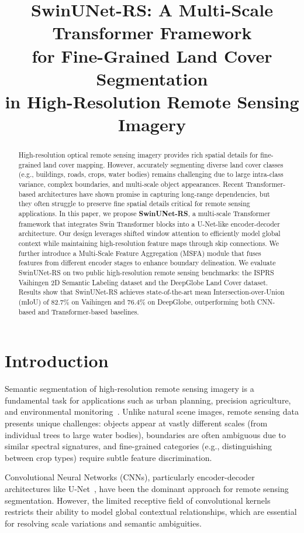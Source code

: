 \documentclass[conference]{IEEEtran}
\title{SwinUNet-RS: A Multi-Scale Transformer Framework\\for Fine-Grained Land Cover Segmentation\\in High-Resolution Remote Sensing Imagery}
\author{
\IEEEauthorblockN{Your Name\IEEEauthorrefmark{1}, Collaborator Name\IEEEauthorrefmark{2}}
\IEEEauthorblockA{\IEEEauthorrefmark{1}Department of Remote Sensing, University of Example, Country}
\IEEEauthorblockA{\IEEEauthorrefmark{2}Institute of Geospatial Informatics, Research Lab, Country}
}
\begin{document}
\maketitle

\begin{abstract}
High-resolution optical remote sensing imagery provides rich spatial details for fine-grained land cover mapping.
However, accurately segmenting diverse land cover classes (e.g., buildings, roads, crops, water bodies) remains challenging
due to large intra-class variance, complex boundaries, and multi-scale object appearances.
Recent Transformer-based architectures have shown promise in capturing long-range dependencies,
but they often struggle to preserve fine spatial details critical for remote sensing applications.
In this paper, we propose \textbf{SwinUNet-RS}, a multi-scale Transformer framework that integrates
Swin Transformer blocks into a U-Net-like encoder-decoder architecture.
Our design leverages shifted window attention to efficiently model global context
while maintaining high-resolution feature maps through skip connections.
We further introduce a Multi-Scale Feature Aggregation (MSFA) module that fuses features
from different encoder stages to enhance boundary delineation.
We evaluate SwinUNet-RS on two public high-resolution remote sensing benchmarks:
the ISPRS Vaihingen 2D Semantic Labeling dataset and the DeepGlobe Land Cover dataset.
Results show that SwinUNet-RS achieves state-of-the-art mean Intersection-over-Union (mIoU)
of 82.7\% on Vaihingen and 76.4\% on DeepGlobe, outperforming both CNN-based and
Transformer-based baselines.
\end{abstract}

\section{Introduction}\label{sec:intro}

Semantic segmentation of high-resolution remote sensing imagery is a fundamental task
for applications such as urban planning, precision agriculture, and environmental monitoring~\cite{zhu2017deep}.
Unlike natural scene images, remote sensing data presents unique challenges:
objects appear at vastly different scales (from individual trees to large water bodies),
boundaries are often ambiguous due to similar spectral signatures,
and fine-grained categories (e.g., distinguishing between crop types) require subtle feature discrimination.

Convolutional Neural Networks (CNNs), particularly encoder-decoder architectures like U-Net~\cite{ronneberger2015unet},
have been the dominant approach for remote sensing segmentation.
However, the limited receptive field of convolutional kernels restricts their ability
to model global contextual relationships, which are essential for resolving scale variations
and semantic ambiguities.
\end{document}
